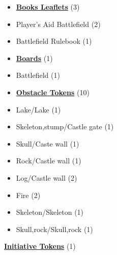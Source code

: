 
\begin{multicols}{3}

\small

\begin{itemize}[leftmargin=0pt, label={}, noitemsep, noitemsep]
  \item \textbf{\underline{Books Leaflets}} (3)
  \item Player's Aid Battlefield (2)
  \item Battlefield Rulebook (1)
\end{itemize}

\begin{itemize}[leftmargin=0pt, label={}, noitemsep, noitemsep]
  \item \textbf{\underline{Boards}} (1)
  \item Battlefield (1)
\end{itemize}

\begin{itemize}[leftmargin=0pt, label={}, noitemsep, noitemsep]
  \item \textbf{\underline{Obstacle Tokens}} (10)
  \item Lake/Lake (1)
  \item Skeleton,stump/Castle gate (1)
  \item Skull/Caste wall (1)
  \item Rock/Castle wall (1)
  \item Log/Castle wall (2)
  \item Fire (2)
  \item Skeleton/Skeleton (1)
  \item Skull,rock/Skull,rock (1)
\end{itemize}

  \textbf{\underline{Initiative Tokens}} (1)


\end{multicols}
